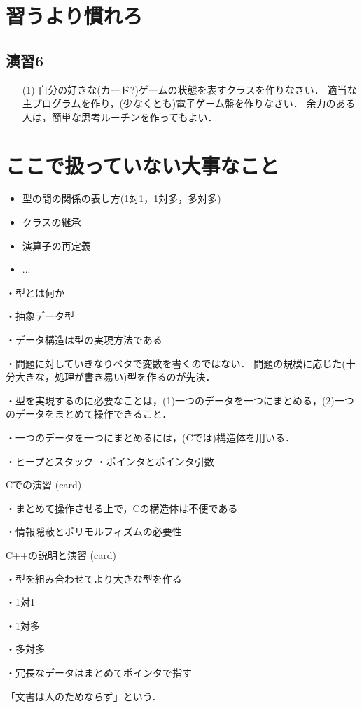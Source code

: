 \section{習うより慣れろ}

\subsection{演習6}

\begin{enumerate}

 \item[(1)] 自分の好きな(カード?)ゲームの状態を表すクラスを作りなさい．
適当な主プログラムを作り，(少なくとも)電子ゲーム盤を作りなさい．
余力のある人は，簡単な思考ルーチンを作ってもよい．

\end{enumerate}

\section{ここで扱っていない大事なこと}

\begin{itemize}

 \item 型の間の関係の表し方(1対1，1対多，多対多)

 \item クラスの継承

 \item 演算子の再定義

 \item ...

\end{itemize}




・型とは何か

・抽象データ型

・データ構造は型の実現方法である

・問題に対していきなりベタで変数を書くのではない．
問題の規模に応じた(十分大きな，処理が書き易い)型を作るのが先決．

・型を実現するのに必要なことは，(1)一つのデータを一つにまとめる，(2)一つのデータをまとめて操作できること．

・一つのデータを一つにまとめるには，(Cでは)構造体を用いる．

・ヒープとスタック
・ポインタとポインタ引数

Cでの演習 (card)

・まとめて操作させる上で，Cの構造体は不便である

・情報隠蔽とポリモルフィズムの必要性

C++の説明と演習 (card)

・型を組み合わせてより大きな型を作る

・1対1

・1対多

・多対多

・冗長なデータはまとめてポインタで指す



「文書は人のためならず」という．

